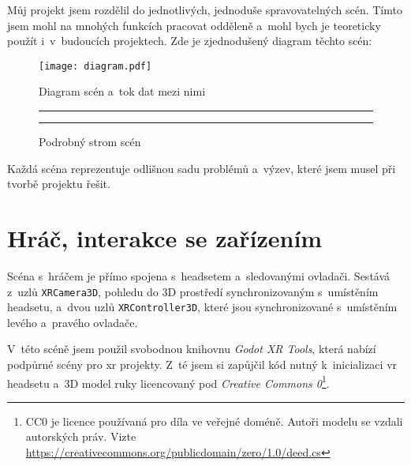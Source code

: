 \begin{samepage}
  Můj projekt jsem rozdělil do jednotlivých, jednoduše spravovatelných scén. Tímto jsem mohl na mnohých funkcích pracovat odděleně a~mohl bych je teoreticky použít i~v~budoucích projektech. Zde je zjednodušený diagram těchto scén:
  
  \begin{figure}[H]
    \centering
    \texttt{[image: diagram.pdf]}
    \caption{Diagram scén a~tok dat mezi nimi}
  \end{figure}
\end{samepage}


\begin{figure}[H]
  \vspace{1em}
  \hrule
  \vspace{1em}
  
  \renewcommand\DTstyle{\sffamily}
  \vspace{1em}
  \hrule
  \vspace{1em}
  \caption{Podrobný strom scén}
\end{figure}

Každá scéna reprezentuje odlišnou sadu problémů a~výzev, které jsem musel při tvorbě projektu řešit.

\section{Hráč, interakce se zařízením}

Scéna s~hráčem je přímo spojena s~headsetem a~sledovanými ovladači. Sestává z~uzlů \texttt{XRCamera3D}, pohledu do 3D prostředí synchronizovaným s~umístěním headsetu, a~dvou uzlů \texttt{XRController3D}, které jsou synchronizované s~umístěním levého a~pravého ovladače.

V~této scéně jsem použil svobodnou knihovnu \textit{Godot XR Tools}, která nabízí podpůrné scény pro \gls{xr} projekty. Z~té jsem si zapůjčil kód nutný k~inicializaci \gls{vr} headsetu a~3D model ruky licencovaný pod \textit{Creative Commons 0}\footnote{CC0 je licence používaná pro díla ve veřejné doméně. Autoři modelu se vzdali autorských práv. Vizte \url{https://creativecommons.org/publicdomain/zero/1.0/deed.cs}}.

